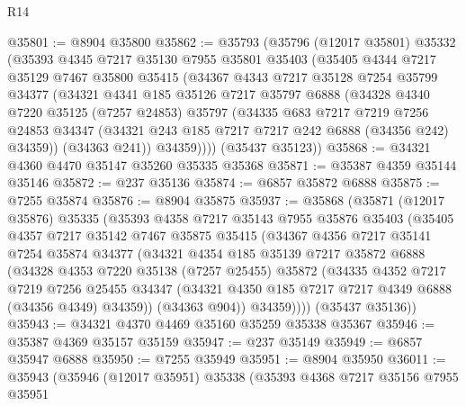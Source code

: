 \begin{lexlean}{R14}
\begin{coremodule}
@35801 := @8904 @35800
@35862 := @35793
    (@35796
      (@12017 @35801)
      @35332
      (@35393
        @4345
        @7217
        @35130
        @7955
        @35801
        @35403
        (@35405
          @4344
          @7217
          @35129
          @7467
          @35800
          @35415
          (@34367
            @4343
            @7217
            @35128
            @7254
            @35799
            @34377
            (@34321
              @4341
              @185
              @35126
              @7217
              @35797
              @6888
              (@34328
                @4340
                @7220
                @35125
                (@7257 @24853)
                @35797
                (@34335
                  @683
                  @7217
                  @7219
                  @7256
                  @24853
                  @34347
                  (@34321 @243 @185 @7217 @7217 @242 @6888 (@34356 @242) @34359))
                (@34363 @241))
              @34359))))
      (@35437 @35123))
@35868 := @34321 @4360 @4470 @35147 @35260 @35335 @35368
@35871 := @35387 @4359 @35144 @35146
@35872 := @237 @35136
@35874 := @6857 @35872 @6888
@35875 := @7255 @35874
@35876 := @8904 @35875
@35937 := @35868
    (@35871
      (@12017 @35876)
      @35335
      (@35393
        @4358
        @7217
        @35143
        @7955
        @35876
        @35403
        (@35405
          @4357
          @7217
          @35142
          @7467
          @35875
          @35415
          (@34367
            @4356
            @7217
            @35141
            @7254
            @35874
            @34377
            (@34321
              @4354
              @185
              @35139
              @7217
              @35872
              @6888
              (@34328
                @4353
                @7220
                @35138
                (@7257 @25455)
                @35872
                (@34335
                  @4352
                  @7217
                  @7219
                  @7256
                  @25455
                  @34347
                  (@34321 @4350 @185 @7217 @7217 @4349 @6888 (@34356 @4349) @34359))
                (@34363 @904))
              @34359))))
      (@35437 @35136))
@35943 := @34321 @4370 @4469 @35160 @35259 @35338 @35367
@35946 := @35387 @4369 @35157 @35159
@35947 := @237 @35149
@35949 := @6857 @35947 @6888
@35950 := @7255 @35949
@35951 := @8904 @35950
@36011 := @35943
    (@35946
      (@12017 @35951)
      @35338
      (@35393
        @4368
        @7217
        @35156
        @7955
        @35951

\end{coremodule}
\end{lexlean}
